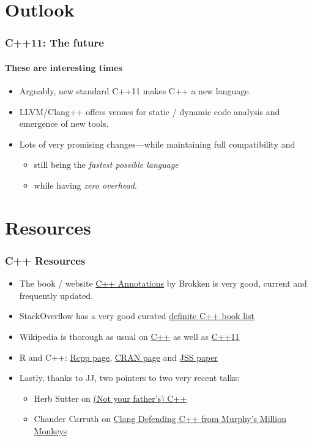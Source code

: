 \documentclass[dvipsnames,compress,pdflatex,beamer]{beamer}
\begin{document}
\section{Outlook}
\begin{frame}
  \frametitle{C++11: The future}
  \framesubtitle{These are interesting times}

  \begin{itemize}[<+->]
  \item Arguably, new standard C++11 makes C++ a new language.
  \item LLVM/Clang++ offers venues for static / dynamic code
    analysis and emergence of new tools.
  \item Lots of very promising changes---while maintaining full
    compatibility and 
    \begin{itemize}
      \item still being the \emph{fastest possible language} 
      \item while having \emph{zero overhead}.
    \end{itemize}
  \end{itemize}
\end{frame}  

\section{Resources}
\begin{frame}
  \frametitle{C++ Resources}
  \begin{itemize}
  \item The book / website
    \href{http://www.icce.rug.nl/documents/cplusplus/}{C++ Annotations} by
    Brokken is very good, current and frequently updated.
  \item StackOverflow has a very good curated
    \href{http://stackoverflow.com/questions/388242/the-definitive-c-book-guide-and-list}{definite C++ book list}
  \item Wikipedia is thorough as usual on
    \href{http://en.wikipedia.org/wiki/C\%2B\%2B}{C++} as well as 
    \href{http://en.wikipedia.org/wiki/C\%2B\%2B11}{C++11}
  \item R and C++: 
    \href{http://dirk.eddelbuettel.com/code/rcpp.html}{Rcpp page}, 
    \href{http://cran.r-project.org/package=Rcpp}{CRAN page} and 
    \href{http://www.jstatsoft.org/v40/i08/}{JSS paper}
  \item Lastly, thanks to JJ, two pointers to two very recent talks: 
    \begin{itemize}
    \item Herb Sutter on \href{http://channel9.msdn.com/Events/Lang-NEXT/Lang-NEXT-2012/-Not-Your-Father-s-C-}{(Not your father's) C++}
    \item Chander Carruth on \href{http://channel9.msdn.com/Events/GoingNative/GoingNative-2012/Clang-Defending-C-from-Murphy-s-Million-Monkeys}{Clang Defending C++ from Murphy's Million Monkeys}
    \end{itemize}
  \end{itemize}
\end{frame}
\end{document}
